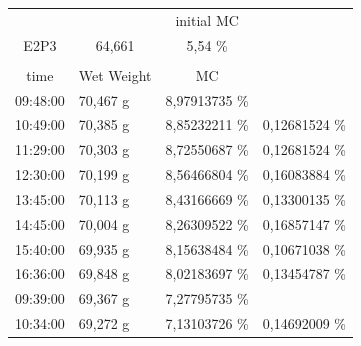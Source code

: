 \begin{table}[]
	\centering
	\begin{tabular}{llll}
		\cline{3-3}
		& \multicolumn{1}{l|}{} & \multicolumn{1}{c|}{initial MC} &  \\ \cline{1-3}
		\multicolumn{1}{|c|}{\cellcolor[HTML]{C65911}E2P3} & \multicolumn{1}{c|}{\cellcolor[HTML]{C65911}64,661} & \multicolumn{1}{c|}{5,54 \%} &  \\ \cline{1-3}
		&  &  &  \\ \cline{1-3}
		\multicolumn{1}{|c|}{time} & \multicolumn{1}{c|}{Wet Weight} & \multicolumn{1}{c|}{MC} &  \\ \cline{1-3}
		\multicolumn{1}{|l|}{09:48:00} & \multicolumn{1}{l|}{70,467 g} & \multicolumn{1}{l|}{8,97913735   \%} &  \\ \hline
		\multicolumn{1}{|l|}{10:49:00} & \multicolumn{1}{l|}{70,385 g} & \multicolumn{1}{l|}{8,85232211   \%} & \multicolumn{1}{l|}{0,12681524 \%} \\ \hline
		\multicolumn{1}{|l|}{11:29:00} & \multicolumn{1}{l|}{70,303 g} & \multicolumn{1}{l|}{8,72550687   \%} & \multicolumn{1}{l|}{0,12681524 \%} \\ \hline
		\multicolumn{1}{|l|}{12:30:00} & \multicolumn{1}{l|}{70,199 g} & \multicolumn{1}{l|}{8,56466804   \%} & \multicolumn{1}{l|}{0,16083884 \%} \\ \hline
		\multicolumn{1}{|l|}{13:45:00} & \multicolumn{1}{l|}{70,113 g} & \multicolumn{1}{l|}{8,43166669   \%} & \multicolumn{1}{l|}{0,13300135 \%} \\ \hline
		\multicolumn{1}{|l|}{14:45:00} & \multicolumn{1}{l|}{70,004 g} & \multicolumn{1}{l|}{8,26309522   \%} & \multicolumn{1}{l|}{0,16857147 \%} \\ \hline
		\multicolumn{1}{|l|}{15:40:00} & \multicolumn{1}{l|}{69,935 g} & \multicolumn{1}{l|}{8,15638484   \%} & \multicolumn{1}{l|}{0,10671038 \%} \\ \hline
		\multicolumn{1}{|l|}{16:36:00} & \multicolumn{1}{l|}{69,848 g} & \multicolumn{1}{l|}{8,02183697   \%} & \multicolumn{1}{l|}{0,13454787 \%} \\ \hline
		\multicolumn{1}{|l|}{\cellcolor[HTML]{A5A5A5}09:39:00} & \multicolumn{1}{l|}{69,367 g} & \multicolumn{1}{l|}{7,27795735   \%} &  \\ \hline
		\multicolumn{1}{|l|}{10:34:00} & \multicolumn{1}{l|}{69,272 g} & \multicolumn{1}{l|}{7,13103726   \%} & \multicolumn{1}{l|}{0,14692009 \%} \\ \hline

\end{tabular}
\end{table}
